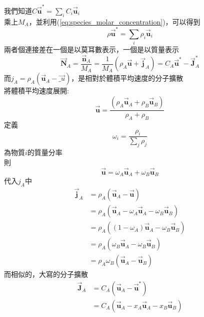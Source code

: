 \documentclass[../main.tex]{subfiles}
\begin{document}
\begin{itemize}
\begin{itemize}
    我們知道$C \vec{\bm u}^\ast = \sum_i C_i \vec{\bm u}_i$\\
    乘上$M_A$，並利用(\ref{eq:species_molar_concentration})，可以得到
    \begin{equation}
      \rho \vec{\bm u}^\ast = \sum_i \rho_i \vec{\bm u}_i
    \end{equation}
    兩者個連接差在一個是以莫耳數表示，一個是以質量表示
    \begin{equation}
      \vec{\bm  N}_A  = \frac{\vec{\bm n}_A}{M_A} = \frac{1}{M_A}\left(
        \rho_A \vec{\bm u} + \vec{\bm j}_A
      \right) =  C_A \vec{\bm u}^\ast - \vec{\bm J}_A^\ast
    \end{equation}
    而$j_A=\rho_A(\vec{\bm u}_A -\vec{\bm_u})$，是相對於體積平均速度的分子擴散\\
    將體積平均速度展開:
    \begin{equation}
      \vec{\bm u} = \frac{\left(\rho_A \vec{\bm u}_A + \rho_B \vec{\bm u}_B\right)}{\rho_A + \rho_B}
    \end{equation}
    定義
    \begin{equation}
      \omega_i = \frac{\rho_i}{\sum_j \rho_j}
    \end{equation}
    為物質$i$的質量分率\\
    則
    \begin{equation}
      \vec{\bm u} = \omega_A \vec{\bm u}_A + \omega_B \vec{\bm u}_B
    \end{equation}
    代入$j_A$中
    \begin{align}
      \vec{\bm j}_A &= \rho_A \left(\vec{\bm u}_A - \vec{\bm u}\right) \nonumber\\
      &= \rho_A \left(\vec{\bm u}_A - \omega_A \vec{\bm u}_A - \omega_B \vec{\bm u}_B\right) \nonumber\\
      &= \rho_A \left(
        (1-\omega_A) \vec{\bm u}_A - \omega_B \vec{\bm u}_B
      \right) \nonumber\\
      &= \rho_A \left(
        \omega_B \vec{\bm u}_A - \omega_B \vec{\bm u}_B
      \right) \nonumber\\
      &= \rho_A \omega_B \left(
        \vec{\bm u}_A - \vec{\bm u}_B
      \right)
    \end{align}
    而相似的，大寫的分子擴散
    \begin{align}
      \vec{\bm J}_A &= C_A \left(\vec{\bm u}_A - \vec{\bm u}^\ast\right) \nonumber\\
      &= C_A \left(\vec{\bm u}_A - x_A \vec{\bm u}_A - x_B \vec{\bm u}_B\right) \nonumber\\

\end{align}
\end{itemize}
\end{itemize}
\end{document}
